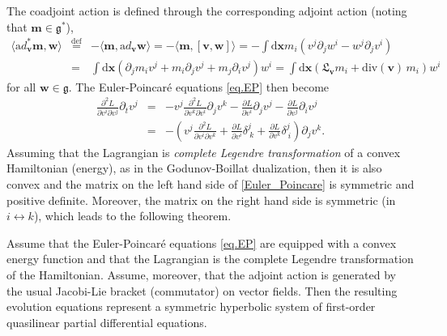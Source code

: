 \documentclass[
10pt, %
a4paper, %
oneside, %
headinclude,footinclude, %
BCOR5mm, %
]{scrartcl}
\newcommand{\xx}{\mathbf{x}}
\newcommand{\dx}{\mathrm{d}\xx}
\newcommand{\mm}{\mathbf{m}}
\newcommand{\vv}{\mathbf{v}}
\newcommand{\ww}{\mathbf{w}}
\newcommand{\Lie}{\mathfrak{L}}
\newcommand{\dive}{\mathrm{div}}
\newcommand{\IP}[1]{{\color{Red}IP:\ \ #1}}
\newcommand{\VK}[1]{{\color{Cyan}VK:\ \ #1}}
\begin{document}
The coadjoint action is defined through the corresponding adjoint action (noting that $\mm\in\mathfrak{g}^*$), 
\begin{eqnarray}
    \langle {\mathrm ad}^*_{\vv} \mm, \ww\rangle &\stackrel{\mathrm{def}}{=}&-\langle \mm, {\mathrm 
    ad}_{\vv} \ww\rangle = -\langle \mm,[\vv,\ww]\rangle
    =-\int\dx m_i (v^j\partial_j w^i - w^j\partial_j v^i)\\
    &=&\int\dx \left( \partial_j m_i v^j + m_i \partial_j v^j + m_j \partial_i v^j\right)w^i 
    =\int\dx \left(\Lie_{\vv} m_i +\dive (\vv)\, m_i\right)w^i\nonumber
\end{eqnarray}
for all $\ww\in \mathfrak{g}$. The Euler-Poincaré equations \eqref{eq.EP} then become 
\begin{eqnarray}\label{Euler_Poincare}
    \frac{\partial^2 L}{\partial v^i\partial v^j}\partial_t v^j &=&
    -v^j \frac{\partial^2 L}{\partial v^k \partial v^i}\partial_j v^k  - \frac{\partial L}{\partial v^i} \partial_j v^j - \frac{\partial L}{\partial v^j} \partial_i v^j\nonumber\\
    &=&-\left(v^j \frac{\partial^2 L}{\partial v^i \partial v^k} + \frac{\partial L}{\partial v^i} 
    \delta^j_{\ k} + \frac{\partial L}{\partial v^k}\delta^j_{\ i} \right)\partial_j v^k.
\end{eqnarray}
Assuming that the Lagrangian is \textit{complete Legendre transformation}
of a 
convex Hamiltonian (energy), as in the Godunov-Boillat dualization, then it is also convex and the matrix on the left hand side of 
\eqref{Euler_Poincare} is 
symmetric and positive definite. Moreover, the matrix on the right hand side is symmetric (in 
$i\leftrightarrow k$), which leads to the following theorem.
\begin{theorem}
Assume that the Euler-Poincaré equations \eqref{eq.EP} are equipped with a convex energy function and that the Lagrangian is the complete Legendre transformation of the Hamiltonian. Assume, moreover, that the adjoint action is generated by the usual Jacobi-Lie bracket (commutator) on vector fields. Then the resulting evolution equations represent a symmetric hyperbolic system of first-order quasilinear partial differential equations.
\end{theorem}

\end{document}
